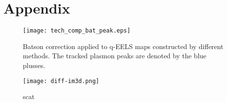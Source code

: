 \section*{Appendix}

\begin{figure}[h!]
    \centering
    \texttt{[image: tech\_comp\_bat\_peak.eps]}\caption{Batson correction applied to q-EELS maps constructed by different methods. The tracked plasmon peaks are denoted by the blue plusses.}
    \label{fig:bat-cor-comp}
\end{figure}
%
\begin{figure}
	\centering
	\texttt{[image: diff-im3d.png]}
	\caption{scat}
	\label{fig:diff-im3d}
\end{figure}
